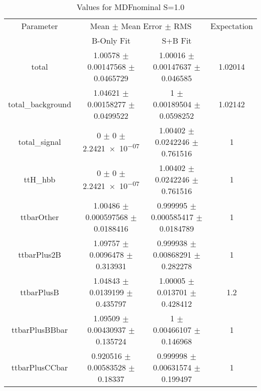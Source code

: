 \begin{table}
\centering
\caption{Values for MDFnominal S=1.0}
\begin{tabular}{cccc}
\toprule
Parameter & \multicolumn{2}{c}{Mean $\pm$ Mean Error $\pm$ RMS} & Expectation\\
 & B-Only Fit & S+B Fit & \\
\midrule
total & \num{1.00578} $\pm$ \num{0.00147568} $\pm$ \num{0.0465729} & \num{1.00016} $\pm$ \num{0.00147637} $\pm$ \num{0.046585} & \num{1.02014}\\
total\_background & \num{1.04621} $\pm$ \num{0.00158277} $\pm$ \num{0.0499522} & \num{1} $\pm$ \num{0.00189504} $\pm$ \num{0.0598252} & \num{1.02142}\\
total\_signal & \num{0} $\pm$ \num{0} $\pm$ \num{2.2421e-07} & \num{1.00402} $\pm$ \num{0.0242246} $\pm$ \num{0.761516} & \num{1}\\
ttH\_hbb & \num{0} $\pm$ \num{0} $\pm$ \num{2.2421e-07} & \num{1.00402} $\pm$ \num{0.0242246} $\pm$ \num{0.761516} & \num{1}\\
ttbarOther & \num{1.00486} $\pm$ \num{0.000597568} $\pm$ \num{0.0188416} & \num{0.999995} $\pm$ \num{0.000585417} $\pm$ \num{0.0184789} & \num{1}\\
ttbarPlus2B & \num{1.09757} $\pm$ \num{0.0096478} $\pm$ \num{0.313931} & \num{0.999938} $\pm$ \num{0.00868291} $\pm$ \num{0.282278} & \num{1}\\
ttbarPlusB & \num{1.04843} $\pm$ \num{0.0139199} $\pm$ \num{0.435797} & \num{1.00005} $\pm$ \num{0.013701} $\pm$ \num{0.428412} & \num{1.2}\\
ttbarPlusBBbar & \num{1.09509} $\pm$ \num{0.00430937} $\pm$ \num{0.135724} & \num{1} $\pm$ \num{0.00466107} $\pm$ \num{0.146968} & \num{1}\\
ttbarPlusCCbar & \num{0.920516} $\pm$ \num{0.00583528} $\pm$ \num{0.18337} & \num{0.999998} $\pm$ \num{0.00631574} $\pm$ \num{0.199497} & \num{1}\\
\bottomrule
\end{tabular}
\end{table}